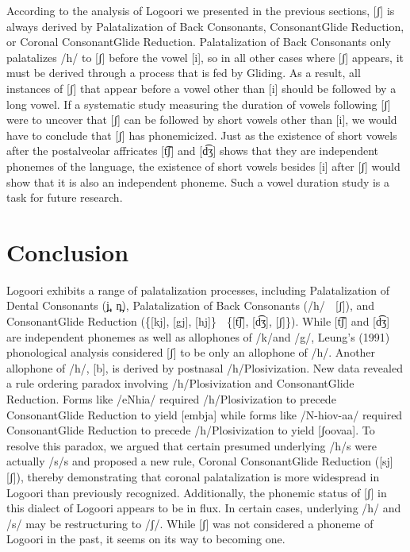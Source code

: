 \documentclass[output=paper]{langsci/langscibook}
\begin{document}
According to the analysis of Logoori we presented in the previous sections, [ʃ] is always derived by Palatalization of Back Consonants, ConsonantGlide Reduction, or Coronal ConsonantGlide Reduction. Palatalization of Back Consonants only palatalizes /h/ to [ʃ] before the vowel [i], so in all other cases where [ʃ] appears, it must be derived through a process that is fed by Gliding. As a result, all instances of [ʃ] that appear before a vowel other than [i] should be followed by a long vowel. If a systematic study measuring the duration of vowels following [ʃ] were to uncover that [ʃ] can be followed by short vowels other than [i], we would have to conclude that [ʃ] has phonemicized. Just as the existence of short vowels after the postalveolar affricates [t͡ʃ] and [d͡ʒ] shows that they are independent phonemes of the language, the existence of short vowels besides [i] after [ʃ] would show that it is also an independent phoneme. Such a vowel duration study is a task for future research.

\section{Conclusion}

Logoori exhibits a range of palatalization processes, including Palatalization of Dental Consonants (j̪, n̪), Palatalization of Back Consonants (/h/  [ʃ]), and ConsonantGlide Reduction (\{[kj], [gj], [hj]\}  \{[t͡ʃ], [d͡ʒ], [ʃ]\}). While [t͡ʃ] and [d͡ʒ] are independent phonemes as well as allophones of /k/and /g/, Leung’s (1991) phonological analysis considered [ʃ] to be only an allophone of /h/. Another allophone of /h/, [b], is derived by postnasal /h/Plosivization. New data revealed a rule ordering paradox involving /h/Plosivization and ConsonantGlide Reduction. Forms like /eNhia/ required /h/Plosivization to precede ConsonantGlide Reduction to yield [embja] while forms like /N-hiov-aa/ required ConsonantGlide Reduction to precede /h/Plosivization to yield [ʃoovaa]. To resolve this paradox, we argued that certain presumed underlying /h/s were actually /s/s and proposed a new rule, Coronal ConsonantGlide Reduction ([sj]  [ʃ]), thereby demonstrating that coronal palatalization is more widespread in Logoori than previously recognized. Additionally, the phonemic status of [ʃ] in this dialect of Logoori appears to be in flux. In certain cases, underlying /h/ and /s/ may be restructuring to /ʃ/. While [ʃ] was not considered a phoneme of Logoori in the past, it seems on its way to becoming one.
\end{document}
